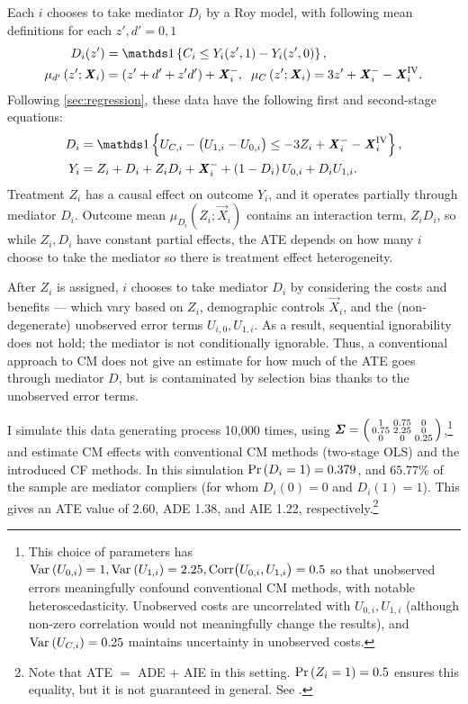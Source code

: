 Each $i$ chooses to take mediator $D_i$ by a Roy model, with following mean definitions for each $z', d' = 0, 1$
\begin{align*}
    D_i(z') &= \indicator{C_i \leq Y_i(z', 1) - Y_i(z', 0)},  \\
    \mu_{d'}\left(z' ; \vec X_i \right) &= \left( z' + d' + z' d' \right) + \vec X_i^-,
    \;\; \mu_{C}\left(z' ; \vec X_i \right) = 3z' + \vec X_i^- - \vec X_i^{\text{IV}}.
\end{align*}
Following \autoref{sec:regression}, these data have the following first and second-stage equations:
\begin{align*}
    D_i &= \indicator{U_{C,i} - \big( U_{1,i} - U_{0,i} \big)
    \leq -3Z_i + \vec X_i^- - \vec X_i^{\text{IV}}},  \\
    Y_i &= Z_i + D_i + Z_i D_i + \vec X_i^-
        + \left( 1 - D_i \right) U_{0,i} + D_i U_{1,i}.
\end{align*}
Treatment $Z_i$ has a causal effect on outcome $Y_i$, and it operates partially through mediator $D_i$.
Outcome mean $\mu_{D_i}\left( Z_i; \vec X_i \right)$ contains an interaction term, $Z_i D_i$, so while $Z_i,D_i$ have constant partial effects, the ATE depends on how many $i$ choose to take the mediator so there is treatment effect heterogeneity.

After $Z_i$ is assigned, $i$ chooses to take mediator $D_i$ by considering the costs and benefits --- which vary based on $Z_i$, demographic controls $\vec X_i$, and the (non-degenerate) unobserved error terms $U_{i,0}, U_{1,i}$.
As a result, sequential ignorability does not hold; the mediator is not conditionally ignorable.
Thus, a conventional approach to CM does not give an estimate for how much of the ATE goes through mediator $D$, but is contaminated by selection bias thanks to the unobserved error terms.

I simulate this data generating process 10,000 times, using $\boldsymbol{\mathit{\Sigma}} =
\left(\begin{smallmatrix} 1 & 0.75 & 0 \\ 0.75 & 2.25 & 0 \\ 0 & 0 & 0.25 \end{smallmatrix}\right)$,\footnote{
    This choice of parameters has $\text{Var}_{} \left( U_{0,i} \right) = 1, \text{Var}_{} \left( U_{1,i} \right) = 2.25, \text{Corr}\big(U_{0,i}, U_{1,i}\big) = 0.5$ so that unobserved errors meaningfully confound conventional CM methods, with notable heteroscedasticity.
    Unobserved costs are uncorrelated with $U_{0,i}, U_{1,i}$ (although non-zero correlation would not meaningfully change the results), and $\text{Var}_{} \left( U_{C,i} \right) = 0.25$ maintains uncertainty in unobserved costs.
}
and estimate CM effects with conventional CM methods (two-stage OLS) and the introduced CF methods.
In this simulation $\Pr\left( D_i = 1 \right) = 0.379$, and $65.77\%$ of the sample are mediator compliers (for whom $D_i(0)=0$ and $D_i(1)=1$).
This gives an ATE value of 2.60, ADE 1.38, and AIE 1.22, respectively.\footnote{
    Note that ATE $=$ ADE $+$ AIE in this setting.
    $\Pr\left( Z_i=1 \right) = 0.5$ ensures this equality, but it is not guaranteed in general.
    See .
}

